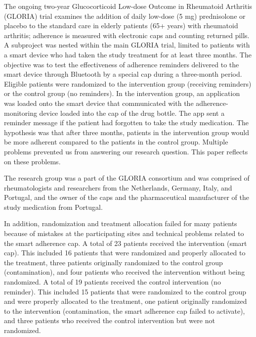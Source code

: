 \documentclass[twocolumn, issue, empirical, authordate]{jote-new-article}
\begin{document}
\begin{originalPurpose}

 The ongoing two-year Glucocorticoid Low-dose Outcome in Rheumatoid Arthritis (GLORIA) trial examines the addition of daily low-dose (5 mg)
prednisolone or placebo to the standard care in elderly patients (65+ years) with rheumatoid arthritis; adherence is measured with electronic caps and counting returned pills. A subproject was nested within the main GLORIA trial, limited to patients with a smart device who had taken the study treatment for at least three months. The objective was to test the effectiveness of adherence reminders delivered to the smart device through Bluetooth by a special cap during a three-month period. Eligible patients were randomized to the intervention group (receiving reminders)
or the control group (no reminders). In the intervention group, an application was loaded onto the smart device that communicated with the adherence-monitoring device loaded into the cap of the drug bottle. The app sent a reminder message if the patient had forgotten to take the study medication. The hypothesis was that after three months, patients in the intervention group would be more adherent compared to the patients in the control group. Multiple problems prevented us from answering our research question. This paper reflects on these problems.


The research group was a part of the GLORIA consortium and was comprised of rheumatologists and researchers from the Netherlands, Germany, Italy, and Portugal, and the owner of the caps and the pharmaceutical manufacturer of the study medication from Portugal.
\end{originalPurpose}
 In addition, randomization and treatment allocation failed for many patients because of mistakes at the participating sites and technical problems related to the smart adherence cap. A total of 23 patients received the intervention (smart cap). This included 16 patients that were randomized and properly allocated to the treatment, three patients originally randomized to the control group (contamination), and four patients who received the intervention without being randomized. A total of 19 patients received the control intervention (no reminder). This included 15 patients that were randomized to the control group and were properly allocated to the treatment, one patient originally randomized to the intervention (contamination, the smart adherence cap failed to activate), and three patients who received the control intervention but were not randomized.
 
\end{document}
